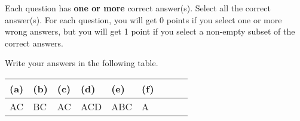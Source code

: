 
Each question has \textbf{one or more} correct answer(s). Select all the correct answer(s). For each question, you will get 0 points if you select one or more wrong answers, but you will get 1 point if you select a non-empty subset of the correct answers.

Write your answers in the following table.


\begin{table}[htbp]
	\centering
	\begin{tabular}{|p{1.7cm}|p{1.7cm}|p{1.7cm}|p{1.7cm}|p{1.7cm}|p{1.7cm}|p{1.7cm}|p{1.7cm}|p{1.7cm}|}
		\hline
		(a) & (b) & (c) & (d) & (e) & (f) \\
		\hline
		AC  & BC  & AC  & ACD & ABC & A   \\
		\hline
	\end{tabular}
\end{table}

